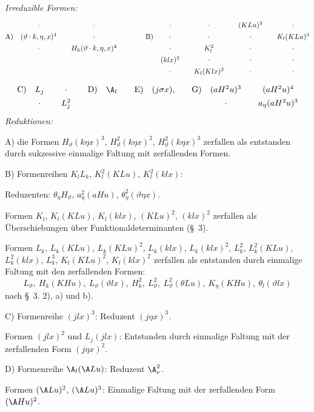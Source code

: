 \noindent\emph{Irreduzible Formen:}
\[
\renewcommand{\arraystretch}{1.35}
\begin{array}{@{}r@{\quad}c@{\qquad}c@{\qquad\qquad}r@{\quad}c@{\qquad}c@{\qquad}c@{\qquad}c@{}}
&\cdot&\cdot&&\cdot&\cdot&(KLu)^3&\cdot\\
\text{A)}&(\vartheta\cdot k,\eta,x)^4&\cdot&\text{B)}&\cdot&\cdot&\cdot&K_l(KLu)^3\\
&\cdot&H_k(\vartheta\cdot k,\eta,x)^4&&\cdot&K_l^2&\cdot&\cdot\\
&&&& (klx)^3&\cdot&\cdot&\cdot\\
&&&&\cdot&K_l(Klx)^3&\cdot&\cdot
\end{array}
\]
\[
\renewcommand{\arraystretch}{1.35}
\begin{array}{@{}r@{\quad}c@{\qquad}c@{\qquad}r@{\quad}c@{\qquad}r@{\quad}c@{\qquad}r@{\quad}c@{\qquad}c@{}}
\text{C)}&L_j&\cdot&\text{D)}&\A_l&\text{E)}&(j\sigma x),&\text{G)}&(aH^2u)^3&(aH^2u)^4\\
&\cdot&L_j^2&&&&&&\cdot&a_\eta(aH^2u)^3
\end{array}
\]
\noindent\emph{Reduktionen:}

A) die Formen $H_\vartheta(k\eta x)^3$, $H_\vartheta^2(k\eta x)^2$, $H_\vartheta^2(k\eta x)^3$ zerfallen als entstanden durch sukzessive einmalige Faltung mit zerfallenden Formen.

B) Formenreihen $K_lL_k$, $K_l^2(KLu)$, $K_l^2(klx)$:

Reduzenten: $\theta_\eta H_\vartheta$, $a_\eta^2(aHu)$, $\theta_\eta^2(\vartheta\eta x)$.

Formen $K_l$, $K_l(KLu)$, $K_l(klx)$, $(KLu)^2$, $(klx)^2$ zerfallen als Überschiebungen über Funktionaldeterminanten (\S\ 3).

Formen $L_k$, $L_k(KLu)$, $L_k(KLu)^2$, $L_k(klx)$, $L_k(klx)^2$, $L_k^2$, $L_k^2(KLu)$, $L_k^2(klx)$, $L_k^3$, $K_l(KLu)^2$, $K_l(klx)^2$ zerfallen als entstanden durch einmalige Faltung mit den zerfallenden Formen:
\[
L_\vartheta,
\ H_k(KHu),
\ L_\vartheta(\vartheta lx),
\ H_k^2,
\ L_\vartheta^2,
\ L_\vartheta^2(\theta Lu),
\ K_\eta(KHu),
\ \theta_l(\vartheta lx)
\]
nach \S\ 3. 2), a) und b).

C) Formenreihe $(jlx)^3$: Reduzent $(j\eta x)^3$.

Formen $(jlx)^2$ und $L_j(jlx)$: Entstanden durch einmalige Faltung mit der zerfallenden Form $(j\eta x)^2$.

D) Formenreihe $\A_l(\A Lu)$: Reduzent $\A_\nu^2$.

Formen $(\A Lu)^2$, $(\A Lu)^3$: Einmalige Faltung mit der zerfallenden Form $(\A Hu)^2$.

